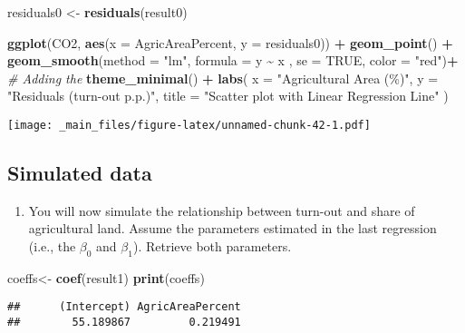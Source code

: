 \documentclass[
]{book}
\newenvironment{Shaded}{\begin{snugshade}}{\end{snugshade}}
\newcommand{\AttributeTok}[1]{\textcolor[rgb]{0.13,0.29,0.53}{#1}}
\newcommand{\CommentTok}[1]{\textcolor[rgb]{0.56,0.35,0.01}{\textit{#1}}}
\newcommand{\ConstantTok}[1]{\textcolor[rgb]{0.56,0.35,0.01}{#1}}
\newcommand{\FunctionTok}[1]{\textcolor[rgb]{0.13,0.29,0.53}{\textbf{#1}}}
\newcommand{\NormalTok}[1]{#1}
\newcommand{\OtherTok}[1]{\textcolor[rgb]{0.56,0.35,0.01}{#1}}
\newcommand{\SpecialCharTok}[1]{\textcolor[rgb]{0.81,0.36,0.00}{\textbf{#1}}}
\newcommand{\StringTok}[1]{\textcolor[rgb]{0.31,0.60,0.02}{#1}}
\providecommand{\tightlist}{%
  \setlength{\itemsep}{0pt}\setlength{\parskip}{0pt}}
\begin{document}
\begin{Shaded}
\begin{Highlighting}[]
\NormalTok{residuals0 }\OtherTok{\textless{}{-}} \FunctionTok{residuals}\NormalTok{(result0)}

\FunctionTok{ggplot}\NormalTok{(CO2, }\FunctionTok{aes}\NormalTok{(}\AttributeTok{x =}\NormalTok{ AgricAreaPercent, }\AttributeTok{y =}\NormalTok{ residuals0)) }\SpecialCharTok{+}
  \FunctionTok{geom\_point}\NormalTok{() }\SpecialCharTok{+}
  \FunctionTok{geom\_smooth}\NormalTok{(}\AttributeTok{method =} \StringTok{"lm"}\NormalTok{, }\AttributeTok{formula =}\NormalTok{ y }\SpecialCharTok{\textasciitilde{}}\NormalTok{ x , }\AttributeTok{se =} \ConstantTok{TRUE}\NormalTok{, }\AttributeTok{color =} \StringTok{"red"}\NormalTok{)}\SpecialCharTok{+}  \CommentTok{\# Adding the}
  \FunctionTok{theme\_minimal}\NormalTok{() }\SpecialCharTok{+}
  \FunctionTok{labs}\NormalTok{(}
    \AttributeTok{x =} \StringTok{"Agricultural Area (\%)"}\NormalTok{,}
    \AttributeTok{y =} \StringTok{"Residuals (turn{-}out p.p.)"}\NormalTok{,}
    \AttributeTok{title =} \StringTok{"Scatter plot with Linear Regression Line"}
\NormalTok{  )}
\end{Highlighting}
\end{Shaded}

\texttt{[image: \_main\_files/figure-latex/unnamed-chunk-42-1.pdf]}

\hypertarget{simulated-data}{%
\subsection{Simulated data}\label{simulated-data}}

\begin{enumerate}
\def\labelenumi{\roman{enumi}.}
\tightlist
\item
  You will now simulate the relationship between turn-out and share of agricultural land. Assume the parameters estimated in the last regression (i.e., the \(\beta_0\) and \(\beta_1\)). Retrieve both parameters.
\end{enumerate}

\begin{Shaded}
\begin{Highlighting}[]
\NormalTok{coeffs}\OtherTok{\textless{}{-}} \FunctionTok{coef}\NormalTok{(result1)}
\FunctionTok{print}\NormalTok{(coeffs)}
\end{Highlighting}
\end{Shaded}

\begin{verbatim}
##      (Intercept) AgricAreaPercent 
##        55.189867         0.219491
\end{verbatim}
\end{document}

